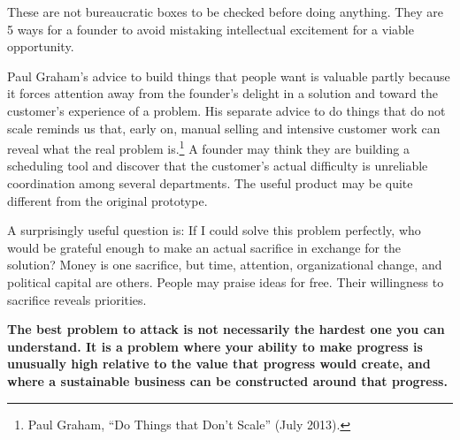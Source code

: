 These are not bureaucratic boxes to be checked before doing anything. They are 5 ways for a founder to avoid mistaking intellectual excitement for a viable opportunity.

Paul Graham's advice to build things that people want is valuable partly because it forces attention away from the founder's delight in a solution and toward the customer's experience of a problem. His separate advice to do things that do not scale reminds us that, early on, manual selling and intensive customer work can reveal what the real problem is.\footnote{Paul Graham, ``Do Things that Don't Scale'' (July 2013).} A founder may think they are building a scheduling tool and discover that the customer's actual difficulty is unreliable coordination among several departments. The useful product may be quite different from the original prototype.

A surprisingly useful question is: If I could solve this problem perfectly, who would be grateful enough to make an actual sacrifice in exchange for the solution? Money is one sacrifice, but time, attention, organizational change, and political capital are others. People may praise ideas for free. Their willingness to sacrifice reveals priorities.

\textbf{The best problem to attack is not necessarily the hardest one you can understand. It is a problem where your ability to make progress is unusually high relative to the value that progress would create, and where a sustainable business can be constructed around that progress.}
